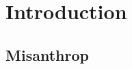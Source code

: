 
\chapter{Introduction}
\label{cha:introducttion}

\section{Misanthrop}
\label{sec:misanthrop}


















